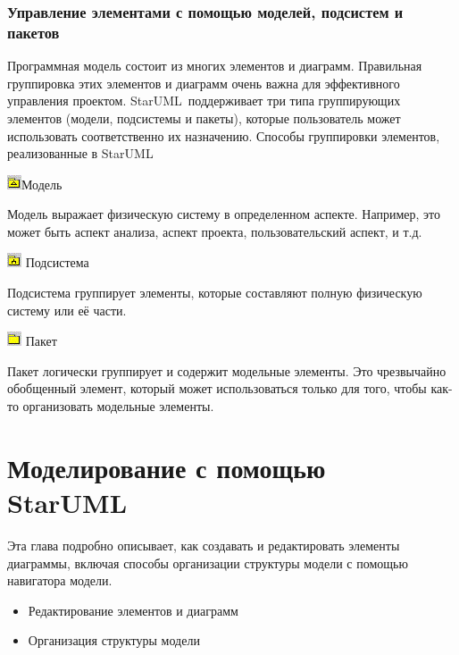 \documentclass[a4paper,12pt]{report}
\newcommand{\staruml}{StarUML\,\tm}
\begin{document}
\subsection*{Управление элементами с помощью моделей, подсистем и пакетов}
Программная модель состоит из многих элементов и диаграмм. Правильная группировка этих
элементов и диаграмм очень важна для эффективного управления проектом. \staruml
поддерживает три типа группирующих элементов (модели, подсистемы и пакеты), которые
пользователь может использовать соответственно их назначению.
Способы группировки элементов, реализованные в \staruml


\includegraphics[width=3ex]{images/folder}Модель

Модель выражает физическую систему в определенном аспекте. Например, это может быть аспект
анализа, аспект проекта, пользовательский аспект, и т.д.

\includegraphics[width=3ex]{images/subsistem}
Подсистема

Подсистема группирует элементы, которые составляют полную физическую систему или её части.

\includegraphics[width=3ex]{images/package}
Пакет

Пакет логически группирует и содержит модельные элементы. Это чрезвычайно обобщенный
элемент, который может использоваться только для того, чтобы как-то организовать модельные
элементы.

\chapter{Моделирование с помощью \staruml}
Эта глава подробно описывает, как создавать и редактировать элементы диаграммы, включая
способы организации структуры модели с помощью навигатора модели.
\begin{itemize}
	\item Редактирование элементов и диаграмм
	\item Организация структуры модели
\end{itemize}
\end{document}
